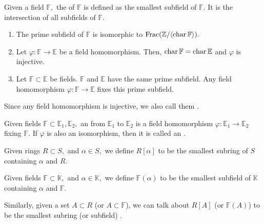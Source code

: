 \begin{defn}%
    Given a field $\mathbb{F},$ the  of $\mathbb{F}$ is defined as the smallest subfield of $\mathbb{F}.$ It is the intersection of all subfields of $\mathbb{F}.$ 
\end{defn}

\begin{prop}
    \phantom{hi}
    \begin{enumerate}
        \item The prime subfield of $\mathbb{F}$ is isomorphic to $\operatorname{Frac}(\mathbb{Z}/\langle \operatorname{char}\mathbb{F}\rangle).$
        \item Let $\varphi : \mathbb{F} \to \mathbb{E}$ be a field homomorphism. Then, $\operatorname{char} \mathbb{F} = \operatorname{char} \mathbb{E}$ and $\varphi$ is injective. 
        \item Let $\mathbb{F} \subset \mathbb{E}$ be fields. $\mathbb{F}$ and $\mathbb{E}$ have the same prime subfield. Any field homomorphism $\varphi : \mathbb{F} \to \mathbb{E}$ fixes this prime subfield.
    \end{enumerate}
\end{prop}

\begin{defn}%
    Since any field homomorphism is injective, we also call them .
\end{defn}

\begin{defn}
    Given fields $\mathbb{F} \subset \mathbb{E}_1, \mathbb{E}_2,$ an  from $\mathbb{E}_1$ to $\mathbb{E}_2$ is a field homomorphism $\varphi : \mathbb{E}_1 \to \mathbb{E}_2$ fixing $\mathbb{F}.$ If $\varphi$ is also an isomorphism, then it is called an .
\end{defn}

\begin{defn}%
    Given rings $R \subset S,$ and $\alpha \in S,$ we define $R[\alpha]$ to be the smallest subring of $S$ containing $\alpha$ and $R.$ 

    Given fields $\mathbb{F} \subset \mathbb{K},$ and $\alpha \in \mathbb{K},$ we define $\mathbb{F}(\alpha)$ to be the smallest subfield of $\mathbb{K}$ containing $\alpha$ and $\mathbb{F}.$ 

    Similarly, given a set $A \subset R$ (or $A \subset \mathbb{F}$), we can talk about $R[A]$ (or $\mathbb{F}(A)$) to be the smallest subring (or subfield) .
\end{defn}

